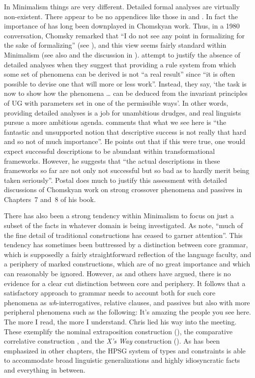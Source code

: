 \documentclass[output=paper]{langsci/langscibook}
\begin{document}
In Minimalism things are very different. Detailed formal analyses are virtually non-existent. There
appear to be no appendices like those in \citet{Sag97a} and \citet{GSag2000a-u}. In fact the
importance of  has long been downplayed in Chomskyan work. Thus, in a 1980
conversation, Chomsky remarked that ``I do not see any point in formalizing for the sake of
formalizing'' (see \citealt[73]{HuybregtsRiemsdijk.1982}), and this view
seems fairly standard within Minimalism (see also  and the discussion
in ). \citet[]{CL95a-u}
attempt to justify the absence of detailed analyses when they suggest that providing a rule 
system from which some set of phenomena can be derived is not ``a real result'' since ``it is often
possible to devise one that will more or less work''. Instead, they say, `the task is now to show how
the phenomena \ldots{} can be deduced from the invariant principles of UG with parameters set in one
of the permissible ways'. In other words, providing detailed analyses is a job for unambitious
drudges, and real linguists pursue a more ambitious agenda. \citet[5]{Postal2004a-u} comments that
what we see here is ``the fantastic and unsupported notion that descriptive success is not really
that hard and so not of much importance''. He points out that if this were true, one would expect
successful descriptions to be abundant within transformational frameworks. However, he suggests that
``the actual descriptions in these frameworks so far are not only not successful but so bad as to
hardly merit being taken seriously''. Postal does much to justify this assessment with detailed
discussions of Chomskyan work on strong crossover phenomena and passives in
Chapters~7 and~8 of his book. 

There has also been a strong tendency within Minimalism to focus on just a subset of the facts in
whatever domain is being investigated. As \citet[535]{CJ2005a} note, ``much of the fine detail of
traditional constructions has ceased to garner attention''. This tendency has sometimes been
buttressed by a distinction between core grammar, which is supposedly a fairly straightforward
reflection of the language faculty, and a periphery of marked constructions, which are of no great
importance and which can reasonably be ignored. However, as \citet{Culicover99a-u} and others have
argued, there is no evidence for a clear cut distinction between core and periphery. It follows that
a satisfactory approach to grammar needs to account both for such core phenomena as
\textit{wh}-interrogatives, relative clauses, and passives but also with more peripheral phenomena
such as the following: 
\eal
\ex It's amazing the people you see here.\label{ex:min-amazing-people}
\ex The more I read, the more I understand.\label{ex:min-read-understand}
\ex Chris lied his way into the meeting.\label{ex:min-chris-meeting}
\zl 
These exemplify the nominal extraposition construction (\citealt{ML96a}), the comparative correlative construction \citet{Borsley2011a-u}, and the \textit{X's Way} construction (\citealt{Sag2012a}). As has been emphasized in other chapters, the HPSG system of types and constraints is able to accommodate broad linguistic generalizations and highly idiosyncratic facts and everything in between.
\end{document}
